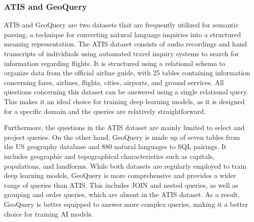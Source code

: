 \subsubsection{\ac{ATIS} and GeoQuery}
\label{sec:atis}

ATIS \cite{dahl-etal-1994-expanding} and GeoQuery \cite{10.1007/3-540-44795-4_40} are two datasets that are frequently utilized for semantic parsing, a technique for converting natural language inquiries into a structured meaning representation. The ATIS dataset consists of audio recordings and hand transcripts of individuals using automated travel inquiry systems to search for information regarding flights. It is structured using a relational schema to organize data from the official airline guide, with 25 tables containing information concerning fares, airlines, flights, cities, airports, and ground services.
All questions concerning this dataset can be answered using a single relational query. This makes it an ideal choice for training deep learning models, as it is designed for a specific domain and the queries are relatively straightforward.

Furthermore, the questions in the ATIS dataset \cite{dahl-etal-1994-expanding} are mainly limited to select and project queries. On the other hand, GeoQuery \cite{10.1007/3-540-44795-4_40} is made up of seven tables from the US geography database and 880 natural languages to SQL pairings. It includes geographic and topographical characteristics such as capitals, populations, and landforms. While both datasets are regularly employed to train deep learning models, GeoQuery \cite{10.1007/3-540-44795-4_40} is more comprehensive and provides a wider range of queries than ATIS. This includes JOIN and nested queries, as well as grouping and order queries, which are absent in the ATIS dataset\cite{dahl-etal-1994-expanding}. As a result, GeoQuery is better equipped to answer more complex queries, making it a better choice for training AI models.



